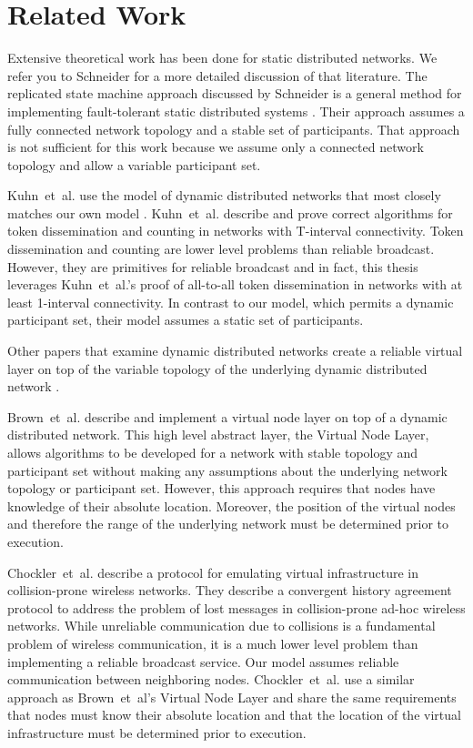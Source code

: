 \documentclass[english]{article}
\begin{document}
\section{Related Work}

Extensive theoretical work has been done for static distributed networks. We refer you to Schneider for a more detailed discussion of that literature. The replicated state machine approach discussed by Schneider is a general method for implementing fault-tolerant static distributed systems \cite{Schneider:1990}. Their approach assumes a fully connected network topology and a stable set of participants. That approach is not sufficient for this work because we assume only a connected network topology and allow a variable participant set. 

Kuhn~et~al. use the model of dynamic distributed networks that most closely matches our own model \cite{Kuhn:2008}. Kuhn~et~al. describe and prove correct algorithms for token dissemination and counting in networks with T-interval connectivity. Token dissemination and counting are lower level problems than reliable broadcast. However, they are primitives for reliable broadcast and in fact, this thesis leverages Kuhn~et~al.'s proof of all-to-all token dissemination in networks with at least 1-interval connectivity. In contrast to our model, which permits a dynamic participant set, their model assumes a static set of participants. 

Other papers that examine dynamic distributed networks create a reliable virtual layer on top of the variable topology of the underlying dynamic distributed network \cite{Brown:2007, Chockler:2008, Gao:2012}. 

Brown~et~al. describe and implement a virtual node layer on top of a dynamic distributed network. This high level abstract layer, the Virtual Node Layer, allows algorithms to be developed for a network with stable topology and participant set without making any assumptions about the underlying network topology or participant set. However, this approach requires that nodes have knowledge of their absolute location. Moreover, the position of the virtual nodes and therefore the range of the underlying network must be determined prior to execution.

Chockler~et~al. describe a protocol for emulating virtual infrastructure in collision-prone wireless networks. They describe a convergent history agreement protocol to address the problem of lost messages in collision-prone ad-hoc wireless networks. While unreliable communication due to collisions is a fundamental problem of wireless communication, it is a much lower level problem than implementing a reliable broadcast service. Our model assumes reliable communication between neighboring nodes. Chockler~et~al. use a similar approach as Brown~et~al's Virtual Node Layer and share the same requirements that nodes must know their absolute location and that the location of the virtual infrastructure must be determined prior to execution.
\end{document}
